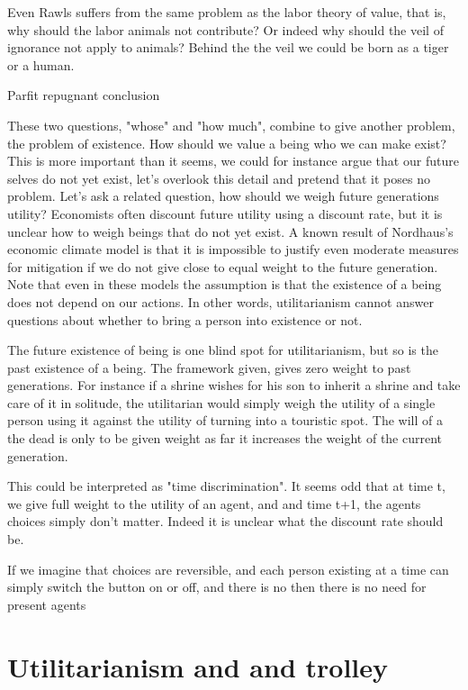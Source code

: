 \documentclass[12pt]{report}
\numberwithin{equation}{section}
\begin{document}
Even Rawls suffers from the same problem as the labor theory of value, that is, why should the labor animals not contribute? Or indeed why should the veil of ignorance not apply to animals? Behind the the veil we could be born as a tiger or a human. 

Parfit repugnant conclusion

These two questions, "whose" and "how much", combine to give another problem, the problem of existence. How should we value a being who we can make exist? This is more important than it seems, we could for instance argue that our future selves do not yet exist, let's overlook this detail and pretend that it poses no problem. Let's ask a related question, how should we weigh future generations utility? Economists often discount future utility using a discount rate, but it is unclear how to weigh beings that do not yet exist. A known result of Nordhaus's economic climate model is that it is impossible to justify even moderate measures for mitigation if we do not give close to equal weight to the future generation. Note that even in these models the assumption is that the existence of a being does not depend on our actions. In other words, utilitarianism cannot answer questions about whether to bring a person into existence or not.

The future existence of being is one blind spot for utilitarianism, but so is the past existence of a being. The framework given, gives zero weight to past generations. For instance if a shrine wishes for his son to inherit a shrine and take care of it in solitude, the utilitarian would simply weigh the utility of a single person using it against the utility of turning into a touristic spot. The will of a the dead is only to be given weight as far it increases the weight of the current generation. 

This could be interpreted as "time discrimination". It seems odd that at time t, we give full weight to the utility of an agent, and and time t+1, the agents choices simply don't matter. Indeed it is unclear what the discount rate should be. 

If we imagine that choices are reversible, and each person existing at a time can simply switch the button on or off, and there is no then there is no need for present agents 


\section{Utilitarianism and and trolley}
\end{document}

